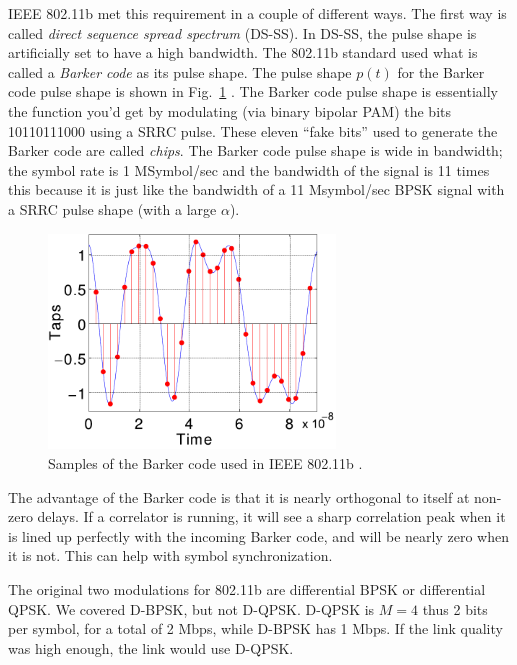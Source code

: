 IEEE 802.11b met this requirement in a couple of different ways.  The first way is called \emph{direct sequence spread spectrum} (DS-SS).  In DS-SS, the pulse shape is artificially set to have a high bandwidth.  The 802.11b standard used what is called a \emph{Barker code} as its pulse shape.  The pulse shape $p(t)$ for the Barker code pulse shape is shown in Fig.~\ref{F:Barkercode} \cite{maas2012channel}.  The Barker code pulse shape is essentially the function you'd get by modulating (via binary bipolar PAM) the bits 10110111000 using a SRRC pulse.  These eleven ``fake bits'' used to generate the Barker code are called \emph{chips}. The Barker code pulse shape is wide in bandwidth; the symbol rate is 1 MSymbol/sec and the bandwidth of the signal is 11 times this because it is just like the bandwidth of a 11 Msymbol/sec BPSK signal with a  SRRC pulse shape (with a large $\alpha$).  

\begin{figure}[htbp]
  \centerline{\includegraphics[width=3.0in]{../images/Barker_v2-eps-converted-to.pdf}}
  \caption{Samples of the Barker code used in IEEE 802.11b \cite{maas2012channel}.}
  \label{F:Barkercode}
\end{figure}

The advantage of the Barker code is that it is nearly orthogonal to itself at non-zero delays.  If a correlator is running, it will see a sharp correlation peak when it is lined up perfectly with the incoming Barker code, and will be nearly zero when it is not.  This can help with symbol synchronization.  

The original two modulations for 802.11b are differential BPSK or differential QPSK.  We covered D-BPSK, but not D-QPSK.  D-QPSK is $M=4$ thus 2 bits per symbol, for a total of 2 Mbps, while D-BPSK has 1 Mbps.  If the link quality was high enough, the link would use D-QPSK.  


